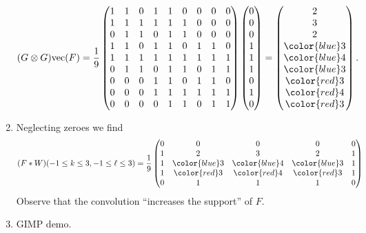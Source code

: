 \begin{enumerate}
	$$(G \otimes G)\text{vec}(F) = 
		\frac{1}{9} 
	\begin{pmatrix}
	1&1&0&1&1&0&0&0&0\\
	1&1&1&1&1&1&0&0&0\\
	0&1&1&0&1&1&0&0&0\\
	1&1&0&1&1&0&1&1&0\\
	1&1&1&1&1&1&1&1&1\\
	0&1&1&0&1&1&0&1&1\\
	0&0&0&1&1&0&1&1&0\\
	0&0&0&1&1&1&1&1&1\\
	0&0&0&0&1&1&0&1&1
	\end{pmatrix}
		\begin{pmatrix}
	0\\0\\0\\1\\1\\1\\0\\1\\0
	\end{pmatrix}
	=
		\begin{pmatrix}
	2\\3\\2\\\color{blue}3\\\color{blue}4\\\color{blue}3\\\color{red}3\\\color{red}4\\\color{red}3
	\end{pmatrix}
	. $$
 \item Neglecting zeroes we find
 $$
 (F \ast W)(-1\leq k \leq 3, -1\leq \ell \leq 3)
 =
		\frac{1}{9}
\begin{pmatrix}
0&0&0&0&0\\
1&2&3&2 &1\\
1&\color{blue}3&\color{blue}4&\color{blue}3 &1\\
1&\color{red}3&\color{red}4&\color{red}3&1\\
0&1&1&1&0\\
\end{pmatrix}
 $$
 Observe that the convolution ``increases the support'' of $F$.
 \item GIMP demo.
 
\end{enumerate}